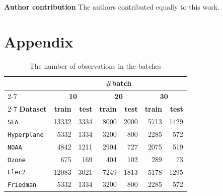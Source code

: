 \documentclass[pdflatex,sn-mathphys-ay]{sn-jnl}%
\theoremstyle{thmstyleone}%
\theoremstyle{thmstyletwo}%
\theoremstyle{thmstylethree}%
\begin{document}
\noindent \textbf{Author contribution} The authors contributed equally to this work.

\newpage
\section*{Appendix}

\label{sec:app}

\begin{table}[h]
    \centering
    \small
    \caption{The number of observations in the batches}
    \label{tab:batch_number}
    \begin{tabular}{lrrrrrr}\toprule
                & \multicolumn{6}{c}{\textbf{\#batch}}\\\cmidrule(lr){2-7}
                & \multicolumn{2}{c}{\textbf{10}} & \multicolumn{2}{c}{\textbf{20}} & \multicolumn{2}{c}{\textbf{30}} \\\cmidrule(lr){2-7}
        \textbf{Dataset} & \textbf{train} & \textbf{test} & \textbf{train} & \textbf{test} & \textbf{train} & \textbf{test} \\\midrule
        \texttt{SEA} & 13332 & 3334 & 8000 & 2000 & 5713 & 1429 \\
        \texttt{Hyperplane} & 5332 & 1334 & 3200 & 800 & 2285 & 572 \\
        \texttt{NOAA} & 4842 & 1211 & 2904 & 727 & 2075 & 519 \\
        \texttt{Ozone} & 675 & 169 & 404 & 102 & 289 & 73 \\
        \texttt{Elec2} & 12083 & 3021 & 7249 & 1813 & 5178 & 1295 \\
        \texttt{Friedman} & 5332 & 1334 & 3200 & 800 & 2285 & 572 \\
        \bottomrule
    \end{tabular}
\end{table}
\end{document}
